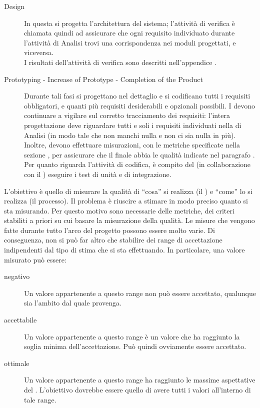 \begin{description}
			\item[  Design] In questa  si progetta l'architettura del sistema; l'attività di verifica è chiamata quindi ad assicurare che ogni requisito individuato durante l'attività di Analisi trovi una corrispondenza nei moduli progettati, e viceversa. \\
			I risultati dell'attività di verifica sono descritti nell'appendice .\\
			\item[ Prototyping - Increase of Prototype - Completion of the Product] Durante tali fasi si progettano nel dettaglio e si codificano tutti i requisiti obbligatori, e quanti più requisiti desiderabili e opzionali possibili.
			I  devono continuare a vigilare sul corretto tracciamento dei requisiti: l'intera progettazione deve riguardare tutti e soli i requisiti individuati nella  di Analisi (in modo tale che non manchi nulla e non ci sia nulla in più). Inoltre, devono effettuare misurazioni, con le metriche specificate nella sezione , per assicurare che il  finale abbia le qualità indicate nel paragrafo .
			Per quanto riguarda l'attività di codifica, è compito del  (in collaborazione con il ) eseguire i test di unità e di integrazione.\\
		\end{description}
	 \label{sec:metriche}
		L'obiettivo è quello di misurare la qualità di “cosa” si realizza (il ) e “come” lo si realizza (il processo). Il problema è 
		riuscire a stimare in modo preciso quanto si sta misurando. Per questo motivo sono necessarie delle metriche, dei criteri stabiliti a 
		priori su cui basare la misurazione della qualità.
			Le misure che vengono fatte durante tutto l'arco del progetto possono essere molto varie. Di conseguenza, non si può far altro che 
			stabilire dei range di accettazione indipendenti dal tipo di stima che si sta effettuando. In particolare, una valore misurato può 
			essere:
			\begin{description}
				\item[negativo] Un valore appartenente a questo range non può essere accettato, qualunque sia l'ambito dal quale provenga.
				\item[accettabile] Un valore appartenente a questo range è un valore che ha raggiunto la soglia minima dell'accettazione. Può 
				quindi ovviamente essere accettato.
				\item[ottimale] Un valore appartenente a questo range ha raggiunto le massime aspettative del . L'obiettivo dovrebbe essere 
				quello di avere tutti i valori all'interno di tale range.
			\end{description}
